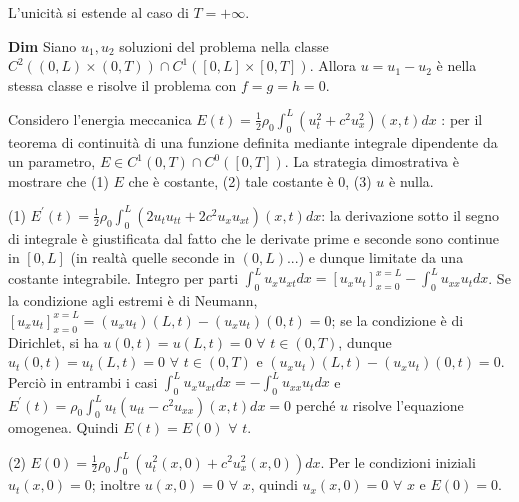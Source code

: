 \documentclass{article}
\begin{document}
L'unicit\`{a} si estende al caso di $T=+\infty $.

\textbf{Dim} Siano $u_{1},u_{2}$ soluzioni del problema nella classe $%
C^{2}\left( \left( 0,L\right) \times \left( 0,T\right) \right) \cap
C^{1}\left( \left[ 0,L\right] \times \left[ 0,T\right] \right) $. Allora $%
u=u_{1}-u_{2}$ \`{e} nella stessa classe e risolve il problema con $f=g=h=0$.

Considero l'energia meccanica $E\left( t\right) =\frac{1}{2}\rho
_{0}\int_{0}^{L}\left( u_{t}^{2}+c^{2}u_{x}^{2}\right) \left( x,t\right) dx$%
: per il teorema di continuit\`{a} di una funzione definita mediante
integrale dipendente da un parametro, $E\in C^{1}\left( 0,T\right) \cap
C^{0}\left( \left[ 0,T\right] \right) $. La strategia dimostrativa \`{e}
mostrare che (1) $E$ che \`{e} costante, (2) tale costante \`{e} $0$, (3) $u$
\`{e} nulla.

(1) $E^{\prime }\left( t\right) =\frac{1}{2}\rho _{0}\int_{0}^{L}\left(
2u_{t}u_{tt}+2c^{2}u_{x}u_{xt}\right) \left( x,t\right) dx$: la derivazione
sotto il segno di integrale \`{e} giustificata dal fatto che le derivate
prime e seconde sono continue in $\left[ 0,L\right] $ (in realt\`{a} quelle
seconde in $\left( 0,L\right) $...) e dunque limitate da una costante
integrabile. Integro per parti $\int_{0}^{L}u_{x}u_{xt}dx=\left[ u_{x}u_{t}%
\right] _{x=0}^{x=L}-\int_{0}^{L}u_{xx}u_{t}dx$. Se la condizione agli
estremi \`{e} di Neumann, $\left[ u_{x}u_{t}\right] _{x=0}^{x=L}=\left(
u_{x}u_{t}\right) \left( L,t\right) -\left( u_{x}u_{t}\right) \left(
0,t\right) =0$; se la condizione \`{e} di Dirichlet, si ha $u\left(
0,t\right) =u\left( L,t\right) =0$ $\forall $ $t\in \left( 0,T\right) $,
dunque $u_{t}\left( 0,t\right) =u_{t}\left( L,t\right) =0$ $\forall $ $t\in
\left( 0,T\right) $ e $\left( u_{x}u_{t}\right) \left( L,t\right) -\left(
u_{x}u_{t}\right) \left( 0,t\right) =0$. Perci\`{o} in entrambi i casi $%
\int_{0}^{L}u_{x}u_{xt}dx=-\int_{0}^{L}u_{xx}u_{t}dx$ e $E^{\prime }\left(
t\right) =\rho _{0}\int_{0}^{L}u_{t}\left( u_{tt}-c^{2}u_{xx}\right) \left(
x,t\right) dx=0$ perch\'{e} $u$ risolve l'equazione omogenea. Quindi $%
E\left( t\right) =E\left( 0\right) $ $\forall $ $t$.

(2) $E\left( 0\right) =\frac{1}{2}\rho _{0}\int_{0}^{L}\left(
u_{t}^{2}\left( x,0\right) +c^{2}u_{x}^{2}\left( x,0\right) \right) dx$. Per
le condizioni iniziali $u_{t}\left( x,0\right) =0$; inoltre $u\left(
x,0\right) =0$ $\forall $ $x$, quindi $u_{x}\left( x,0\right) =0$ $\forall $ 
$x$ e $E\left( 0\right) =0$.
\end{document}
